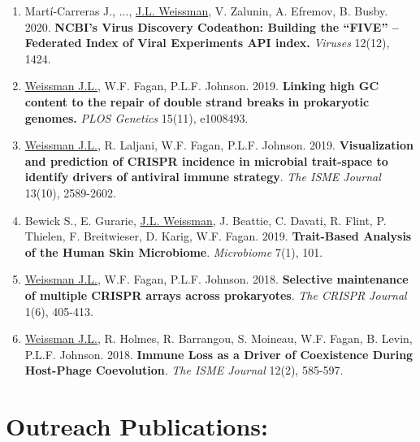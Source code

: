\documentclass[]{res}
\begin{document}
\begin{resume}
\begin{enumerate}[leftmargin=*]
\item Mart\'{i}-Carreras J., ..., \underline{J.L. Weissman}, V. Zalunin, A. Efremov, B. Busby. 2020. {\bf NCBI’s Virus Discovery Codeathon: Building the “FIVE” -- Federated Index of Viral Experiments API index.} \emph{Viruses} 12(12), 1424.
 
 \item \underline{Weissman J.L.}, W.F. Fagan, P.L.F. Johnson. 2019. {\bf Linking high GC content to the repair of double strand breaks in prokaryotic genomes.} \emph{PLOS Genetics} 15(11), e1008493.\\ %
 
 \item \underline{Weissman J.L.}, R. Laljani, W.F. Fagan, P.L.F. Johnson. 2019. {\bf Visualization and prediction of CRISPR incidence in microbial trait-space to identify drivers of antiviral immune strategy}. \emph{The ISME Journal} 13(10), 2589-2602. %
 
 \item Bewick S., E. Gurarie, \underline{J.L. Weissman}, J. Beattie, C. Davati, R. Flint, P. Thielen, F. Breitwieser, D. Karig, W.F. Fagan. 2019. {\bf Trait-Based Analysis of the Human Skin Microbiome}. \emph{Microbiome} 7(1), 101.  %

 \item \underline{Weissman J.L.}, W.F. Fagan, P.L.F. Johnson. 2018. {\bf Selective maintenance of multiple CRISPR arrays across prokaryotes}. \emph{The CRISPR Journal} 1(6), 405-413. %
 
\item \underline{Weissman J.L.}, R. Holmes, R. Barrangou, S. Moineau, W.F. Fagan, B. Levin, P.L.F. Johnson. 2018. {\bf Immune Loss as a Driver of Coexistence During Host-Phage Coevolution}. \emph{The ISME Journal} 12(2), 585-597. %

\end{enumerate} 
 

 
\section{Outreach Publications:} \vspace{0mm}

 \begin{enumerate}[leftmargin=*]


\end{enumerate}
\end{resume}
\end{document}
